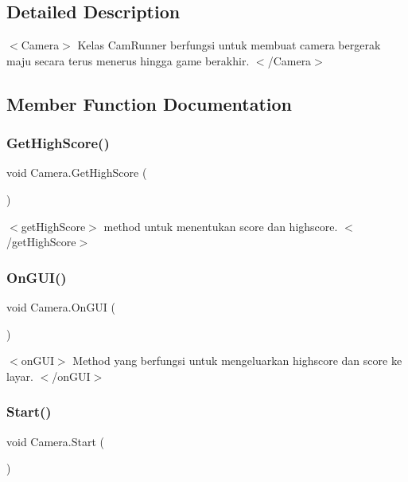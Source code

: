 \subsection{Detailed Description}
$<$\+Camera$>$ Kelas Cam\+Runner berfungsi untuk membuat camera bergerak maju secara terus menerus hingga game berakhir. $<$/\+Camera$>$ 

\subsection{Member Function Documentation}
\hypertarget{class_camera_a15e8198aec6c455bfc5016d64152a92c}{}\label{class_camera_a15e8198aec6c455bfc5016d64152a92c} 
\subsubsection{\texorpdfstring{Get\+High\+Score()}{GetHighScore()}}
{\footnotesize\ttfamily void Camera.\+Get\+High\+Score (\begin{DoxyParamCaption}{ }\end{DoxyParamCaption})\hspace{0.3cm}{\ttfamily [private]}}

$<$get\+High\+Score$>$ method untuk menentukan score dan highscore. $<$/get\+High\+Score$>$ \hypertarget{class_camera_a59fc70f1cd765b02d2858e2fe51d2013}{}\label{class_camera_a59fc70f1cd765b02d2858e2fe51d2013} 
\subsubsection{\texorpdfstring{On\+G\+U\+I()}{OnGUI()}}
{\footnotesize\ttfamily void Camera.\+On\+G\+UI (\begin{DoxyParamCaption}{ }\end{DoxyParamCaption})\hspace{0.3cm}{\ttfamily [private]}}

$<$on\+G\+U\+I$>$ Method yang berfungsi untuk mengeluarkan highscore dan score ke layar. $<$/on\+G\+U\+I$>$ \hypertarget{class_camera_a6dd760883224d50af4d916ca57a26370}{}\label{class_camera_a6dd760883224d50af4d916ca57a26370} 
\subsubsection{\texorpdfstring{Start()}{Start()}}
{\footnotesize\ttfamily void Camera.\+Start (\begin{DoxyParamCaption}{ }\end{DoxyParamCaption})\hspace{0.3cm}{\ttfamily [private]}}

